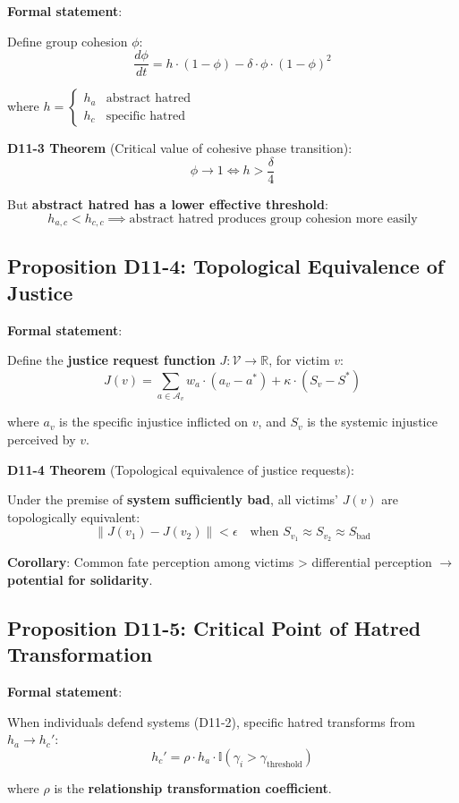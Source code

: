\documentclass[12pt,a4paper]{article}
\newcommand{\calV}{\mathcal{V}}
\newcommand{\calA}{\mathcal{A}}
\begin{document}
\textbf{Formal statement}:

Define group cohesion $\phi$:
$$\frac{d\phi}{dt} = h \cdot (1 - \phi) - \delta \cdot \phi \cdot (1 - \phi)^2$$

where $h = \begin{cases} h_a & \text{abstract hatred} \\ h_c & \text{specific hatred} \end{cases}$

\textbf{D11-3 Theorem} (Critical value of cohesive phase transition):
$$\phi \to 1 \iff h > \frac{\delta}{4}$$

But \textbf{abstract hatred has a lower effective threshold}:
$$h_{a, c} < h_{c, c} \implies \text{abstract hatred produces group cohesion more easily}$$

\subsection{Proposition D11-4: Topological Equivalence of Justice}

\textbf{Formal statement}:

Define the \textbf{justice request function} $J: \calV \to \mathbb{R}$, for victim $v$:
$$J(v) = \sum_{a \in \calA_v} w_a \cdot (a_v - a^*) + \kappa \cdot (S_v - S^*)$$

where $a_v$ is the specific injustice inflicted on $v$, and $S_v$ is the systemic injustice perceived by $v$.

\textbf{D11-4 Theorem} (Topological equivalence of justice requests):

Under the premise of \textbf{system sufficiently bad}, all victims' $J(v)$ are topologically equivalent:
$$\|J(v_1) - J(v_2)\| < \epsilon \quad \text{when } S_{v_1} \approx S_{v_2} \approx S_{\text{bad}}$$

\textbf{Corollary}: Common fate perception among victims > differential perception $\to$ \textbf{potential for solidarity}.

\subsection{Proposition D11-5: Critical Point of Hatred Transformation}

\textbf{Formal statement}:

When individuals defend systems (D11-2), specific hatred transforms from $h_a \to h_c'$:
$$h_c' = \rho \cdot h_a \cdot \mathbb{I}(\gamma_i > \gamma_{\text{threshold}})$$

where $\rho$ is the \textbf{relationship transformation coefficient}.
\end{document}
